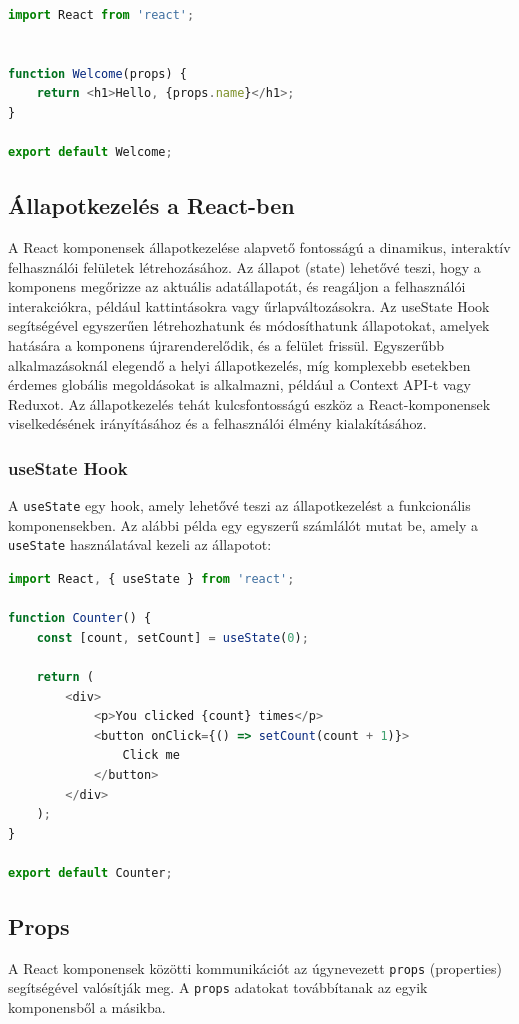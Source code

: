 \documentclass[colorlinks]{thesis-kando}
\theoremstyle{definition}
\theoremstyle{remark}
\begin{document}
\pagebreak

\begin{lstlisting}[language=JavaScript]
import React from 'react';


function Welcome(props) {
    return <h1>Hello, {props.name}</h1>;
}

export default Welcome;
\end{lstlisting}

\subsection{Állapotkezelés a React-ben}
A React komponensek állapotkezelése alapvető fontosságú a dinamikus, interaktív felhasználói felületek létrehozásához. Az állapot (state) lehetővé teszi, hogy a komponens megőrizze az aktuális adatállapotát, és reagáljon a felhasználói interakciókra, például kattintásokra vagy űrlapváltozásokra. Az useState Hook segítségével egyszerűen létrehozhatunk és módosíthatunk állapotokat, amelyek hatására a komponens újrarenderelődik, és a felület frissül. Egyszerűbb alkalmazásoknál elegendő a helyi állapotkezelés, míg komplexebb esetekben érdemes globális megoldásokat is alkalmazni, például a Context API-t vagy Reduxot. Az állapotkezelés tehát kulcsfontosságú eszköz a React-komponensek viselkedésének irányításához és a felhasználói élmény kialakításához.

\subsubsection{useState Hook}
A \texttt{useState} egy hook, amely lehetővé teszi az állapotkezelést a funkcionális komponensekben. Az alábbi példa egy egyszerű számlálót mutat be, amely a \texttt{useState} használatával kezeli az állapotot:

\begin{lstlisting}[language=JavaScript]
import React, { useState } from 'react';

function Counter() {
    const [count, setCount] = useState(0);

    return (
        <div>
            <p>You clicked {count} times</p>
            <button onClick={() => setCount(count + 1)}>
                Click me
            </button>
        </div>
    );
}

export default Counter;
\end{lstlisting}

\subsection{Props}
A React komponensek közötti kommunikációt az úgynevezett \texttt{props} (properties) segítségével valósítják meg. A \texttt{props} adatokat továbbítanak az egyik komponensből a másikba.
\end{document}
